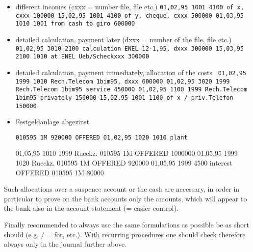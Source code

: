 \begin{itemize}

\item different incomes (cxxx = number file, file etc.)  {\tt  01,02,95 1001
4100 of x, cxxx 100000 15,02,95 1001 4100 of y, cheque, cxxx 500000 01,03,95
1010 1001 from cash to giro 600000 }



\item detailed calculation, payment later (dxxx = number of the file, file etc.)
{\tt  01,02,95 3010 2100 calculation ENEL 12-1,95, dxxx 300000 15,03,95 2100
1010 at ENEL Ueb/Scheckxxx 300000 }



\item detailed calculation, payment immediately, allocation of the costs  {\tt 
01,02,95 1999 1010 Rech.Telecom 1bim95, dxxx 600000 01,02,95 3020 1999
Rech.Telecom 1bim95 service 450000 01,02,95 1100 1999 Rech.Telecom 1bim95
privately 150000 15,02,95 1001 1100 of x / priv.Telefon 150000 }



\item Festgeldanlage abgezinst  {\tt  010595 1M 920000 OFFERED 01,02,95 1020 1010
plant

01,05,95 1010 1999 Rueckz.  010595 1M OFFERED 1000000 01,05,95 1999 1020
Rueckz.  010595 1M OFFERED 920000 01,05,95 1999 4500 interest OFFERED 010595 1M
80000 }



\end{itemize}

 Such allocations over a suspence account or the cash are necessary, in
order in particular to prove on the bank accounts only the amounts, which will
appear to the bank also in the account statement (= easier control).

 Finally recommended to always use the same formulations as possible be as
short should (e.g. / = for, etc.).  With recurring procedures one should check
therefore always only in the journal further above.

